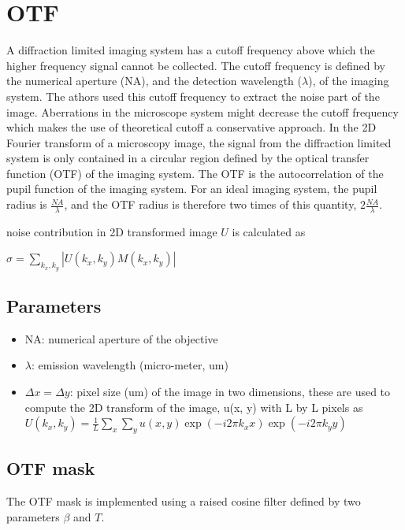 \documentclass[11pt]{article}
\providecommand{\tightlist}{%
      \setlength{\itemsep}{0pt}\setlength{\parskip}{0pt}}
\begin{document}
    \section{OTF}\label{otf}

A diffraction limited imaging system has a cutoff frequency above which
the higher frequency signal cannot be collected. The cutoff frequency is
defined by the numerical aperture (NA), and the detection wavelength
(\(\lambda\)), of the imaging system. The athors used this cutoff
frequency to extract the noise part of the image. Aberrations in the
microscope system might decrease the cutoff frequency which makes the
use of theoretical cutoff a conservative approach. In the 2D Fourier
transform of a microscopy image, the signal from the diffraction limited
system is only contained in a circular region defined by the optical
transfer function (OTF) of the imaging system. The OTF is the
autocorrelation of the pupil function of the imaging system. For an
ideal imaging system, the pupil radius is \(\frac{NA}{\lambda}\), and
the OTF radius is therefore two times of this quantity,
\(2\frac{NA}{\lambda}\).

noise contribution in 2D transformed image \(U\) is calculated as

\(\sigma = \sum_{k_x, k_y}|U(k_x, k_y)M(k_x, k_y)|\)

\subsection{Parameters}\label{parameters}

\begin{itemize}
\tightlist
\item
  NA: numerical aperture of the objective
\item
  \(\lambda\): emission wavelength (micro-meter, um)
\item
  \(\Delta x = \Delta y\): pixel size (um) of the image in two
  dimensions, these are used to compute the 2D transform of the image,
  u(x, y) with L by L pixels as
  \(U(k_x, k_y) = \frac{1}{L}\sum_x\sum_y u(x, y) \exp(-i2\pi k_x x)\exp(-i2\pi k_y y)\)
\end{itemize}

\subsection{OTF mask}\label{otf-mask}

The OTF mask is implemented using a raised cosine filter defined by two
parameters \(\beta\) and \(T\).
\end{document}
